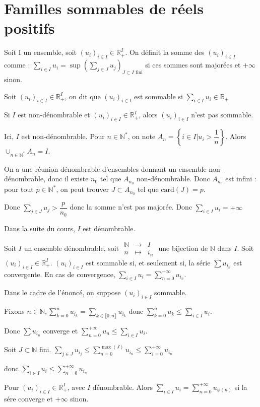 \documentclass[a4paper,12pt]{book}
\newcommand{\Def}[2]{\begin{tcolorbox}[sharp corners, colback=white,colframe=blue!90!black!75, title=Définition : #1]#2\end{tcolorbox}}
\newcommand{\Thr}[2]{\begin{tcolorbox}[sharp corners, colback=white,colframe=red!90!black!75, title=Théorème : #1]#2\end{tcolorbox}}
\newcommand{\Prop}[2]{\begin{tcolorbox}[sharp corners, colback=white,colframe=red!90!black!75, title=Proposition : #1]#2\end{tcolorbox}}
\newcommand{\Pre}[1]{\begin{tcolorbox}[sharp corners, colback=white,colframe=green!60!green!30!black!75, title=Preuve]#1\end{tcolorbox}}
\def\R{\mathbb{R}}
\def\N{\mathbb{N}}
\begin{document}
\section{Familles sommables de réels positifs}
\Def{Somme de familles réelles positives}{Soit I un ensemble, soit $(u_i)_{i\in I}\in \R_+^I$. On définit la somme des $(u_i)_{i\in I}$ comme : $\sum\limits_{i\in I} u_i = \sup\left(\sum\limits_{j\in J} u_j\right)_{J\subset I\text{ fini}}$ si ces sommes sont majorées et $+\infty$ sinon.}
\Def{Familles sommables de réels positifs}{Soit $(u_i)_{i\in I}\in\R_+^I$, on dit que $(u_i)_{i\in I}$ est sommable si $\sum\limits_{i\in I} u_i\in \R_+$}
\Prop{Sommabilité et dénombrabilité}{Si $I$ est non-dénombrable et $(u_i)_{i\in I}\in \R_+^I$, alors $(u_i)_{i\in I}$ n'est pas sommable.}
\Pre{Ici, $I$ est non-dénombrable. Pour $n\in\N^*$, on note $A_n=\left\{i\in I\vert u_i>\dfrac{1}{n}\right\}$. Alors $\cup_{n\in\N^*} A_n = I$.
\par On a une réunion dénombrable d'ensembles donnant un ensemble non-dénombrable, donc il existe $n_0$ tel que $A_{n_0}$ non-dénombrable. Donc $A_{n_0}$ est infini : pour tout $p\in\N^*$, on peut trouver $J\subset A_{n_0}$ tel que $\mathrm{card}(J)= p$. 
\par Donc $\sum\limits_{j\in J} u_j>\dfrac{p}{n_0}$ donc la somme n'est pas majorée. Donc $\sum\limits_{i\in I} u_i = +\infty$}
Dans la suite du cours, $I$ est dénombrable.
\Thr{}{Soit $I$ un ensemble dénombrable, soit $\begin{array}{rcl} \N&\to&I \\n&\mapsto&i_n\end{array}$ une bijection de $\N$ dans $I$. Soit $(u_i)_{i\in I}\in\R_+^I$. $(u_i)_{i\in I}$ est sommable si, et seulement si, la série $\sum u_{i_n}$ est convergente. En cas de convergence, $\sum\limits_{i\in I} u_i = \sum\limits_{n=0}^{+\infty} u_{i_n}$.}
\Pre{Dans le cadre de l'énoncé, on suppose $(u_i)_{i\in I}$ sommable.\par Fixons $n\in\N, \sum\limits_{k=0}^n u_{i_k} = \sum\limits_{k\in\llbracket0,n\rrbracket}u_{i_k}$ donc $\sum\limits_{k=0}^nu_k \leq \sum\limits_{i\in I}u_i$.\par Donc $\sum u_{i_n}$ converge et $\sum\limits_{n=0}^{+\infty}u_n\leq \sum\limits_{i\in I} u_i$.
\par Soit $J\subset \N$ fini. $\sum\limits_{j\in J}u_{i_j}\leq \sum\limits_{n=0}^{\max(J)} u_{i_n} \leq \sum\limits_{i=0}^{+\infty}u_{i_n}$ \par donc $\sum\limits_{i\in I}u_i \leq \sum\limits_{n=0}^{+\infty}u_{i_n}$
\par Pour $(u_i)_{i\in I}\in\R_+^I$, avec $I$ dénombrable. Alors $\sum\limits_{i\in I} u_i = \sum\limits_{n=0}^{+\infty} u_{\varphi(n)}$ si la sére converge et $+\infty$ sinon.}
\end{document}
